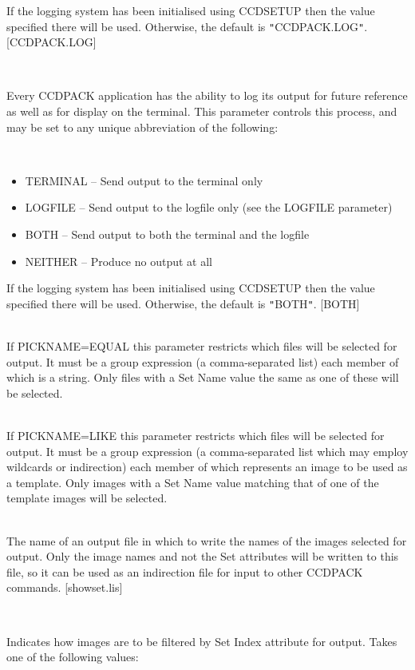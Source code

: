 \documentclass[twoside,11pt]{article}
\newcommand{\htmlref}[2]{#1}
\renewcommand{\_}{\texttt{\symbol{95}}}
\newcommand{\xroutine}[1]{\htmlref{{\sc #1}}{#1}}
\newcommand{\sstsubsection}[1]{ \item[{#1}] \mbox{} \\}
\newcommand{\sstitemlist}[1]{
  \mbox{} \\
  \vspace{-3.5ex}
  \begin{itemize}
     #1
  \end{itemize}
}
\newcommand{\sstitem}{\item}
\newcommand{\sstsubsection}[1]{\item[{#1}]}
\newcommand{\sstitemlist}[1]{
      \begin{itemize}
         #1
      \end{itemize}
      \\
   }
\newcommand{\sstitem}{\item}
\begin{document}
{{{         If the logging system has been initialised using \xroutine{CCDSETUP}
         then the value specified there will be used. Otherwise, the
         default is {\tt "}CCDPACK.LOG{\tt "}.
         [CCDPACK.LOG]
      }
      \sstsubsection{
         LOGTO = LITERAL (Read)
      }{
         Every CCDPACK application has the ability to log its output
         for future reference as well as for display on the terminal.
         This parameter controls this process, and may be set to any
         unique abbreviation of the following:
         \sstitemlist{

            \sstitem
               TERMINAL  -- Send output to the terminal only

            \sstitem
               LOGFILE   -- Send output to the logfile only (see the
                               LOGFILE parameter)

            \sstitem
               BOTH      -- Send output to both the terminal and the
                               logfile

            \sstitem
               NEITHER   -- Produce no output at all

         }
         If the logging system has been initialised using \xroutine{CCDSETUP}
         then the value specified there will be used. Otherwise, the
         default is {\tt "}BOTH{\tt "}.
         [BOTH]
      }
      \sstsubsection{
         NAME = LITERAL (Read)
      }{
         If PICKNAME=EQUAL this parameter restricts which files will
         be selected for output.  It must be a group expression
         (a comma-separated list) each member of which is a string.
         Only files with a Set Name value the same as one of these
         will be selected.
      }
      \sstsubsection{
         NAMELIKE = LITERAL (Read)
      }{
         If PICKNAME=LIKE this parameter restricts which files will
         be selected for output.  It must be a group expression
         (a comma-separated list which may employ wildcards or
         indirection) each member of which represents an image to
         be used as a template.  Only images with a Set Name value
         matching that of one of the template images will be selected.
      }
      \sstsubsection{
         NAMELIST = LITERAL (Read)
      }{
         The name of an output file in which to write the names of
         the images selected for output.  Only the image names and not
         the Set attributes will be written to this file, so it
         can be used as an indirection file for input to other
         CCDPACK commands.
         [showset.lis]
      }
      \sstsubsection{
         PICKINDEX = LITERAL (Read)
      }{
         Indicates how images are to be filtered by Set Index attribute for
         output.  Takes one of the following values:
         \sstitemlist{

}}}}
\end{document}
